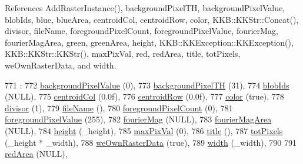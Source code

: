 References Add\+Raster\+Instance(), background\+Pixel\+TH, background\+Pixel\+Value, blob\+Ids, blue, blue\+Area, centroid\+Col, centroid\+Row, color, K\+K\+B\+::\+K\+K\+Str\+::\+Concat(), divisor, file\+Name, foreground\+Pixel\+Count, foreground\+Pixel\+Value, fourier\+Mag, fourier\+Mag\+Area, green, green\+Area, height, K\+K\+B\+::\+K\+K\+Exception\+::\+K\+K\+Exception(), K\+K\+B\+::\+K\+K\+Str\+::\+K\+K\+Str(), max\+Pix\+Val, red, red\+Area, title, tot\+Pixels, we\+Own\+Raster\+Data, and width.


\begin{DoxyCode}
771                 :
772   \hyperlink{class_k_k_b_1_1_raster_ab7ed2191cce116a6a37029dc6e3713ef}{backgroundPixelValue} (0),
773   \hyperlink{class_k_k_b_1_1_raster_a3c4e96eaf48274f5d8912617f81f2a0b}{backgroundPixelTH}    (31),
774   \hyperlink{class_k_k_b_1_1_raster_a0fc9a1588e809db0b701f0a886bfd18c}{blobIds}              (NULL),
775   \hyperlink{class_k_k_b_1_1_raster_ac4cb3984d20f6eef6fd4f201681ea1d5}{centroidCol}          (0.0f),
776   \hyperlink{class_k_k_b_1_1_raster_a3380e5734ec57a147e36c734cc83c5ff}{centroidRow}          (0.0f),
777   \hyperlink{class_k_k_b_1_1_raster_a482384d89cc53fa4f36276307c746854}{color}                (\textcolor{keyword}{true}),
778   \hyperlink{class_k_k_b_1_1_raster_afaaaf54fd824a4a47fba97f7fba9398f}{divisor}              (1),
779   \hyperlink{class_k_k_b_1_1_raster_a742e1da027493443f2dda570a89fe2e9}{fileName}             (),
780   \hyperlink{class_k_k_b_1_1_raster_aa7e86253f4b9c347da718732e44b60e8}{foregroundPixelCount} (0),
781   \hyperlink{class_k_k_b_1_1_raster_ac9a5cec097e9fed669fe3c44bcc1678c}{foregroundPixelValue} (255),
782   \hyperlink{class_k_k_b_1_1_raster_a16d18df2f29a49c7a8ee670e0ea0c3a9}{fourierMag}           (NULL),
783   \hyperlink{class_k_k_b_1_1_raster_adc50969a106f5b57aca3a9ce512df0ce}{fourierMagArea}       (NULL),
784   \hyperlink{class_k_k_b_1_1_raster_af39ff189de4fbb6de98392e187efafb7}{height}               (\_height),
785   \hyperlink{class_k_k_b_1_1_raster_a4f37d3b83826f522f61af0918a1d5546}{maxPixVal}            (0),
786   \hyperlink{class_k_k_b_1_1_raster_a2dc74728363b538563b6626422651236}{title}                (),
787   \hyperlink{class_k_k_b_1_1_raster_a9b08c4a0ca0a35435a478599635f1dc0}{totPixels}            (\_height * \_width),
788   \hyperlink{class_k_k_b_1_1_raster_a3f960c2c781707efa7942d4fd2065e52}{weOwnRasterData}      (\textcolor{keyword}{true}),
789   \hyperlink{class_k_k_b_1_1_raster_ae0bcc103e191c3421d7692dc69ceb554}{width}                (\_width),
790 
791   \hyperlink{class_k_k_b_1_1_raster_aaef16f7d4dc7c8b99e84176d0babd731}{redArea}              (NULL),

\end{DoxyCode}
